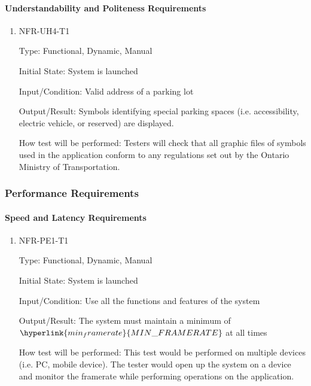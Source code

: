 \documentclass[12pt, titlepage]{article}
\begin{document}
\paragraph{Understandability and Politeness Requirements}

\begin{enumerate}

\item{NFR-UH4-T1}

Type: Functional, Dynamic, Manual
					
Initial State: System is launched
					
Input/Condition: Valid address of a parking lot
					
Output/Result: Symbols identifying special parking spaces (i.e. accessibility,
electric vehicle, or reserved) are displayed.
					
How test will be performed: Testers will check that all graphic files of symbols
used in the application conform to any regulations set out by the Ontario
Ministry of Transportation.
					
\end{enumerate}

\subsubsection{Performance Requirements}
\label{sec:5.2.3}
\paragraph{Speed and Latency Requirements}

\begin{enumerate}

\item{NFR-PE1-T1}

Type: Functional, Dynamic, Manual
					
Initial State: System is launched
					
Input/Condition: Use all the functions and features of the system
					
Output/Result: The system must maintain a minimum of
$\hyperlink{min_framerate}{MIN\_FRAMERATE}$ at all times
					
How test will be performed: This test would be performed on multiple devices
(i.e. PC, mobile device). The tester would open up the system on a device and
monitor the framerate while performing operations on the application.
					
\end{enumerate}
\end{document}
